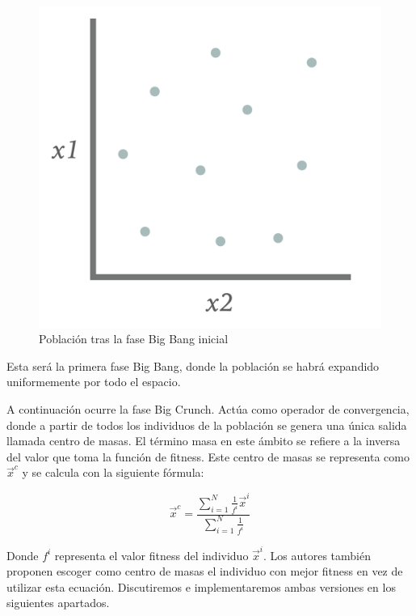 \begin{figure}[H]
    \centering
        \includegraphics[scale=0.23]{img/initial_big_bang.png}
        \caption{Población tras la fase Big Bang inicial}
\end{figure}

Esta será la primera fase Big Bang, donde la población se habrá expandido uniformemente por todo el espacio.

A continuación ocurre la fase Big Crunch. Actúa como operador de convergencia, donde a partir de todos los individuos de la población se genera una única salida llamada centro de masas. El término masa en este ámbito se refiere a la inversa del valor que toma la función de fitness. Este centro de masas se representa como $\vec{x}^c$ y se calcula con la siguiente fórmula:

\begin{equation}
    \label{eqn:centromasas}
    \vec{x}^c = \frac{\sum^{N}_{i=1}\frac{1}{f^i}\vec{x}^i}{\sum^{N}_{i=1}\frac{1}{f^i}}
\end{equation}

Donde $f^i$ representa el valor fitness del individuo $\vec{x}^i$. Los autores también proponen escoger como centro de masas el individuo con mejor fitness en vez de utilizar esta ecuación. Discutiremos e implementaremos ambas versiones en los siguientes apartados.

